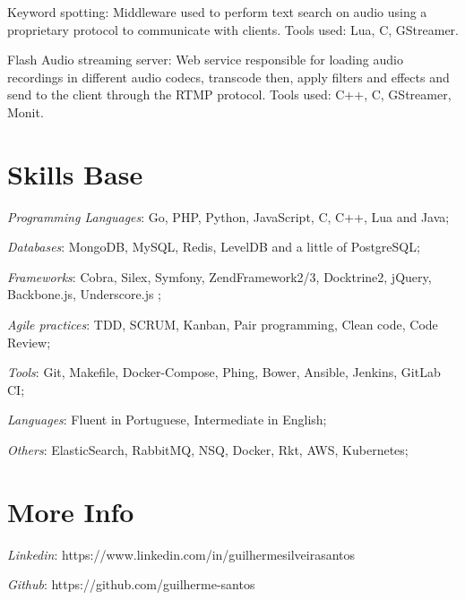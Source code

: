 \documentclass[margin]{res}
\begin{document}
\begin{resume}
Keyword spotting: Middleware used to perform text search on audio using a proprietary protocol to communicate with clients. Tools used: Lua, C, GStreamer.

Flash Audio streaming server: Web service responsible for loading audio recordings in different audio codecs, transcode then, apply filters and effects and send to the client through the RTMP protocol. Tools used: C++, C, GStreamer, Monit.

\section{Skills Base} \textit{Programming Languages}: Go, PHP, Python, JavaScript, C, C++, Lua and Java;

	\textit{Databases}: MongoDB, MySQL, Redis, LevelDB and a little of PostgreSQL;

	\textit{Frameworks}: Cobra, Silex, Symfony, ZendFramework2/3, Docktrine2, jQuery, Backbone.js, Underscore.js ;

	\textit{Agile practices}: TDD, SCRUM, Kanban, Pair programming, Clean code, Code Review;

	\textit{Tools}: Git, Makefile, Docker-Compose, Phing, Bower, Ansible, Jenkins, GitLab CI;

	\textit{Languages}: Fluent in Portuguese, Intermediate in English;

	\textit{Others}: ElasticSearch, RabbitMQ, NSQ, Docker, Rkt, AWS, Kubernetes;

\section{More Info} \textit{Linkedin}: https://www.linkedin.com/in/guilhermesilveirasantos

    \textit{Github}: https://github.com/guilherme-santos

\end{resume}
\end{document}

